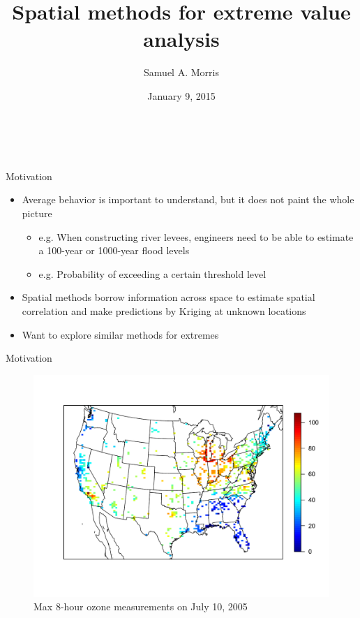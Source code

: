 \documentclass{beamer}
\title[Spatial methods for EVA] %
{
  Spatial methods for extreme value analysis
}
\author[S. Morris]{Samuel A. Morris}
\institute[]{North Carolina State University}
\date[]{January 9, 2015}
\begin{document}
\begin{frame}\frametitle{\ }
\begin{center}
  \maketitle
\end{center}
\end{frame}

\begin{frame}{Motivation}
  \begin{itemize} \setlength{\itemsep}{1em}
    \item Average behavior is important to understand, but it does not paint the whole picture
    \begin{itemize}
      \item e.g. When constructing river levees, engineers need to be able to estimate a 100-year or 1000-year flood levels
      \item e.g. Probability of exceeding a certain threshold level
    \end{itemize}
    \item Spatial methods borrow information across space to estimate spatial correlation and make predictions by Kriging at unknown locations
    \item Want to explore similar methods for extremes
  \end{itemize}
\end{frame}

\begin{frame}{Motivation}
  \centering
  \begin{figure}
    \includegraphics[width=\linewidth, trim=0 1in 0 1in ]{./plots/pot/ozone-10jul-us.pdf}
    \caption{Max 8-hour ozone measurements on July 10, 2005}
   \end{figure}
\end{frame}
\end{document}
